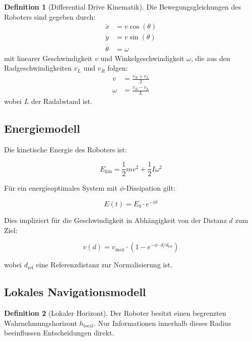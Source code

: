 ﻿\documentclass[a4paper,12pt]{article}
\theoremstyle{definition}
\newtheorem{definition}{Definition}
\begin{document}
\begin{definition}[Differential Drive Kinematik]
	Die Bewegungsgleichungen des Roboters sind gegeben durch:
	\begin{align}
		\dot{x} &= v \cos(\theta) \\
		\dot{y} &= v \sin(\theta) \\
		\dot{\theta} &= \omega
	\end{align}
	mit linearer Geschwindigkeit $v$ und Winkelgeschwindigkeit $\omega$, die aus den Radgeschwindigkeiten $v_L$ und $v_R$ folgen:
	\begin{align}
		v &= \frac{v_R + v_L}{2} \\
		\omega &= \frac{v_R - v_L}{L}
	\end{align}
	wobei $L$ der Radabstand ist.
\end{definition}

\subsection{Energiemodell}

Die kinetische Energie des Roboters ist:

\begin{equation}
E_{\text{kin}} = \frac{1}{2}m v^2 + \frac{1}{2}I \omega^2
\end{equation}

Für ein energieoptimales System mit $\phi$-Dissipation gilt:

\begin{equation}
E(t) = E_0 \cdot e^{-\phi t}
\end{equation}

Dies impliziert für die Geschwindigkeit in Abhängigkeit von der Distanz $d$ zum Ziel:

\begin{equation}\label{eq:phi_speed}
v(d) = v_{\max} \cdot \left(1 - e^{-\phi \cdot d / d_{\text{ref}}}\right)
\end{equation}

wobei $d_{\text{ref}}$ eine Referenzdistanz zur Normalisierung ist.

\subsection{Lokales Navigationsmodell}

\begin{definition}[Lokaler Horizont]
	Der Roboter besitzt einen begrenzten Wahrnehmungshorizont $h_{\text{local}}$. Nur Informationen innerhalb dieses Radius beeinflussen Entscheidungen direkt.
\end{definition}
\end{document}
